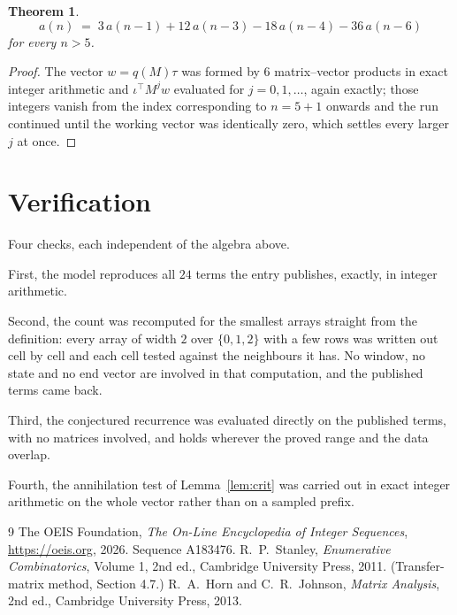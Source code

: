 \documentclass[11pt,a4paper]{article}
\theoremstyle{plain}
\newtheorem{theorem}{Theorem}
\theoremstyle{definition}
\begin{document}
\begin{theorem}
\[
a(n)\;=\;3\,a(n-1) + 12\,a(n-3) - 18\,a(n-4) - 36\,a(n-6)
\]
for every $n>5$.
\end{theorem}

\begin{proof}
The vector $w=q(M)\tau$ was formed by $6$ matrix--vector products in exact integer
arithmetic and $\iota^{\!\top}M^{j}w$ evaluated for $j=0,1,\dots$, again exactly; those
integers vanish from the index corresponding to $n=5+1$ onwards and the run continued
until the working vector was identically zero, which settles every larger $j$ at once.
\end{proof}

\section{Verification}

Four checks, each independent of the algebra above.

First, the model reproduces all $24$ terms the entry publishes, exactly, in integer
arithmetic.

Second, the count was recomputed for the smallest arrays straight from the definition: every
array of width $2$ over $\{0,1,2\}$ with a few rows was written out cell by cell and each cell
tested against the neighbours it has. No window, no state and no end vector are involved in that
computation, and the published terms came back.

Third, the conjectured recurrence was evaluated directly on the published terms, with no
matrices involved, and holds wherever the proved range and the data overlap.

Fourth, the annihilation test of Lemma~\ref{lem:crit} was carried out in exact integer
arithmetic on the whole vector rather than on a sampled prefix.

\begin{thebibliography}{9}
 The OEIS Foundation, \emph{The On-Line Encyclopedia of Integer
Sequences}, \url{https://oeis.org}, 2026. Sequence A183476.
 R.~P.~Stanley, \emph{Enumerative Combinatorics}, Volume 1, 2nd ed.,
Cambridge University Press, 2011. (Transfer-matrix method, Section 4.7.)
 R.~A.~Horn and C.~R.~Johnson, \emph{Matrix Analysis}, 2nd ed., Cambridge
University Press, 2013.
\end{thebibliography}
\end{document}
